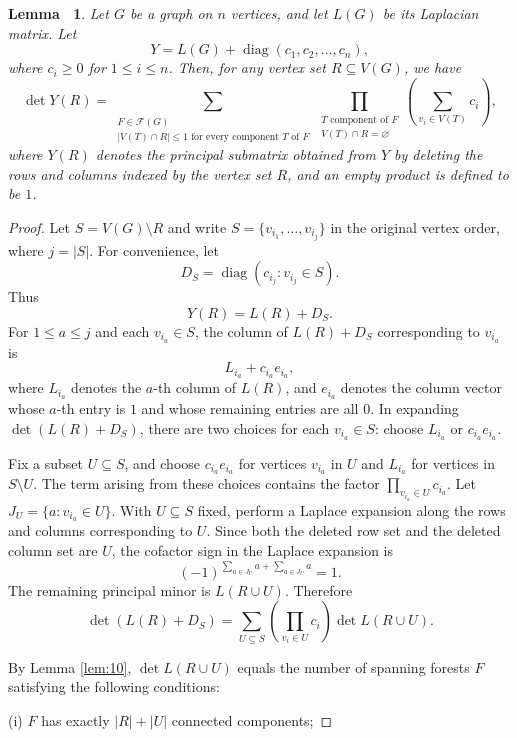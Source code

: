 \documentclass[11pt, a4paper]{article}
\theoremstyle{plain}
\newtheorem{lemma}{Lemma\ }[section]
\begin{document}
\begin{lemma}\label{lem:11}
Let $G$ be a graph on $n$ vertices, and let $L(G)$ be its Laplacian matrix. Let
\[
Y=L(G)+\operatorname{diag}(c_1, c_2, \dots, c_n),
\]
where $c_i \geq 0$ for $1 \leq i \leq n$.
Then, for any vertex set $R\subseteq V(G)$, we have
\[
\det Y(R)
=
\sum_{\substack{F\in\mathcal{F}(G)\\
|V(T)\cap R|\le 1 \text{ for every component } T \text{ of } F}}
\prod_{\substack{T \text{ component of } F\\
V(T)\cap R=\varnothing}}
\left(\sum_{v_i \in V(T)}c_i\right),
\]
where $Y(R)$ denotes the principal submatrix obtained from $Y$ by deleting the rows and columns indexed by the vertex set $R$, and an empty product is defined to be $1$.
\end{lemma}
\begin{proof}
Let $S=V(G)\setminus R$ and write $S=\{v_{i_1}, \ldots, v_{i_j}\}$ in the original vertex order, where $j=|S|$.
For convenience, let
\[
D_S=\operatorname{diag}(c_{i_j}: v_{i_j}\in S).
\]
Thus
\[
Y(R)=L(R)+D_S.
\]
For $1\leq a\leq j$ and each $v_{i_a}\in S$, the column of $L(R)+D_S$ corresponding to $v_{i_a}$ is
\[
L_{i_a}+c_{i_a}e_{i_a},
\]
where $L_{i_a}$ denotes the $a$-th column of $L(R)$, and $e_{i_a}$ denotes the column vector whose $a$-th entry is $1$ and whose remaining entries are all $0$.
In expanding $\det(L(R)+D_S)$, there are two choices for each $v_{i_a}\in S$: choose $L_{i_a}$ or $c_{i_a}e_{i_a}$.

Fix a subset $U\subseteq S$, and choose $c_{i_a}e_{i_a}$ for vertices $v_{i_a}$ in $U$ and $L_{i_a}$ for vertices in $S\setminus U$.
The term arising from these choices contains the factor $\prod_{v_{i_a}\in U}c_{i_a}$.
Let $J_U=\{a: v_{i_a}\in U\}$.
With $U\subseteq S$ fixed, perform a Laplace expansion along the rows and columns corresponding to $U$.
Since both the deleted row set and the deleted column set are $U$, the cofactor sign in the Laplace expansion is
\[
(-1)^{\sum_{a\in J_U}a+\sum_{a\in J_U}a}=1.
\]
The remaining principal minor is $L(R\cup U)$.
Therefore
\begin{equation}\label{eq:20}
\det(L(R)+D_S)
=
\sum_{U\subseteq S}
\left(
\prod_{v_i\in U}c_i
\right)
\det L(R\cup U).
\end{equation}

By Lemma \ref{lem:10},
$\det L(R\cup U)$
equals the number of spanning forests $F$ satisfying the following conditions:

(i) $F$ has exactly $|R|+|U|$ connected components;


\end{proof}
\end{document}
